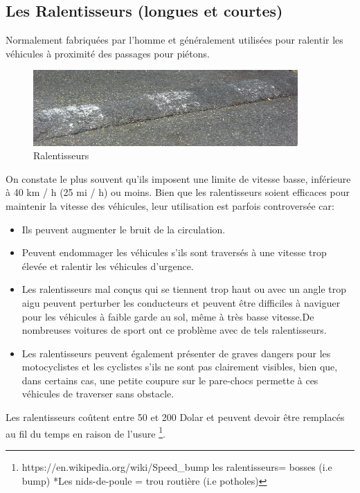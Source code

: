 \subsection{ Les Ralentisseurs (longues et courtes)}

Normalement fabriquées par l'homme et généralement utilisées pour ralentir les véhicules à proximité des passages pour piétons.
\begin{figure}[h!]
    \center
    \includegraphics[width=0.9\textwidth]{Images/chapter1/Speedbump.jpg}
    \caption{Ralentisseurs}
    \end{figure}
On constate le plus souvent qu'ils imposent une limite de vitesse basse, inférieure à 40 km / h (25 mi / h) ou moins.
Bien que les ralentisseurs soient efficaces pour maintenir la vitesse des véhicules, leur utilisation est parfois 
controversée car:
 \begin{itemize}
    \item Ils peuvent augmenter le bruit de la circulation.
    \item Peuvent endommager les véhicules s'ils sont traversés à une vitesse trop élevée et ralentir les véhicules d'urgence.
    \item Les ralentisseurs mal conçus qui se tiennent trop haut ou avec un angle
      trop aigu peuvent perturber les conducteurs et peuvent être difficiles à naviguer pour les véhicules à faible garde au sol,
      même à très basse vitesse.De nombreuses voitures de sport ont ce problème avec de tels ralentisseurs. 
    \item Les ralentisseurs peuvent également présenter de graves dangers pour les motocyclistes et les cyclistes s'ils ne sont pas
    clairement visibles, bien que, dans certains cas, une petite coupure sur le pare-chocs permette à ces véhicules de
     traverser sans obstacle.
  \end{itemize}

  Les ralentisseurs coûtent entre 50 et 200 Dolar et peuvent devoir être remplacés au fil du temps 
   en raison de l'usure 
   \footnote{https://en.wikipedia.org/wiki/Speed\_bump \newline *les ralentisseurs= bosses (i.e bump) *Les nids-de-poule = trou routière (i.e potholes)}.  


